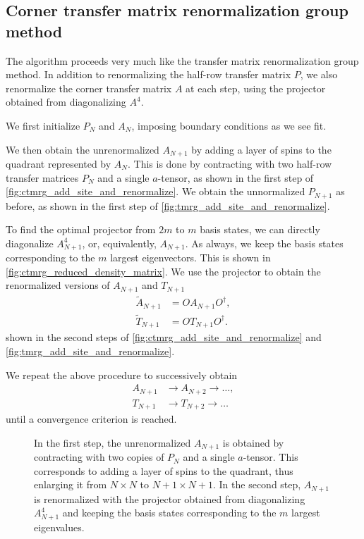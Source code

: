 \subsection{Corner transfer matrix renormalization group method}

The algorithm proceeds very much like the transfer matrix renormalization group method. In addition to renormalizing the half-row transfer matrix $P$, we also renormalize the
corner transfer matrix $A$ at each step, using the projector obtained from diagonalizing
$A^4$.


We first initialize $P_N$ and $A_N$, imposing boundary conditions as we see fit.

We then obtain the unrenormalized $A_{N+1}$ by adding a layer of spins to the quadrant
represented by $A_N$. This is done by contracting with two half-row transfer matrices
$P_N$ and a single $a$-tensor, as shown in the first step of
\autoref{fig:ctmrg_add_site_and_renormalize}. We obtain the unnormalized $P_{N+1}$ as
before, as shown in the first step of \autoref{fig:tmrg_add_site_and_renormalize}.

To find the optimal projector from $2m$ to $m$ basis states, we can directly diagonalize
$A_{N + 1}^4$, or, equivalently, $A_{N + 1}$. As always, we keep the basis states
corresponding to the $m$ largest eigenvectors. This is shown in
\autoref{fig:ctmrg_reduced_density_matrix}. We use the projector to obtain the
renormalized versions of $A_{N + 1}$ and $T_{N + 1}$
\begin{align}
    \widetilde{A}_{N + 1} &= OA_{N + 1}O^{\dagger}, \\
    \widetilde{T}_{N + 1} &= OT_{N + 1}O^{\dagger}.
\end{align}
shown in the second steps of \autoref{fig:ctmrg_add_site_and_renormalize} and
\autoref{fig:tmrg_add_site_and_renormalize}.

We repeat the above procedure to successively obtain
\begin{align}
  A_{N + 1} & \rightarrow A_{N + 2} \rightarrow \dots, \\
  T_{N + 1} & \rightarrow T_{N + 2} \rightarrow \dots
\end{align}
until a convergence criterion is reached.

\begin{figure}
  
  \caption{In the first step, the unrenormalized $A_{N+1}$ is obtained by contracting with
  two copies of $P_N$ and a single $a$-tensor. This corresponds to adding a layer of spins
  to the quadrant, thus enlarging it from $N \times N$ to $N + 1 \times N + 1$. In the
  second step, $A_{N + 1}$ is renormalized with the projector obtained from diagonalizing
  $A_{N+1}^4$ and keeping the basis states corresponding to the $m$ largest eigenvalues.  }
  \label{fig:ctmrg_add_site_and_renormalize}
\end{figure}


